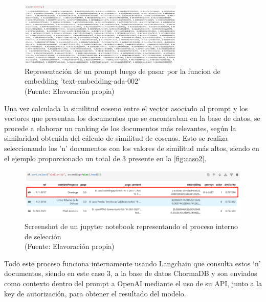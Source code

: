 \begin{figure}[ht!]
    \centering
    \includegraphics[width=0.7\textwidth]{figures/embedding1.png}
    \caption[Representación vectorial de un prompt luego de pasar por la funcion de embedding]{Representación de un prompt luego de pasar por la funcion de embedding 'text-embedding-ada-002'\\
    {\scriptsize (Fuente: Elavoración propia)}}
    \label{fig:caso1}
\end{figure}

\newpage

Una vez calculada la similitud coseno entre el vector asociado al prompt y los vectores que presentan los documentos que se encontraban en la 
base de datos, se procede a elaborar un ranking de los documentos más relevantes, según la similaridad obtenida del cálculo de similitud de cosenos. 
Esto se realiza seleccionando los 'n' documentos con los valores de similitud más altos, siendo en el ejemplo proporcionado un total de 3 
presente en la \autoref{fig:caso2}.

\begin{figure}[ht!]
    \centering
    \includegraphics[width=1\textwidth]{figures/embedding2.png}
    \caption[Screenshot de un jupyter notebook representando el proceso interno de selección]{Screenshot de un jupyter notebook representando el proceso interno de selección\\
    {\scriptsize (Fuente: Elavoración propia)}}
    \label{fig:caso2}
\end{figure}

Todo este proceso funciona internamente usando Langchain que consulta estos ‘n’ documentos, siendo en este caso 3, a la base de datos 
ChormaDB y son enviados como contexto dentro del prompt a OpenAI mediante el uso de su API, junto a la key de autorización, 
para obtener el resultado del modelo.

